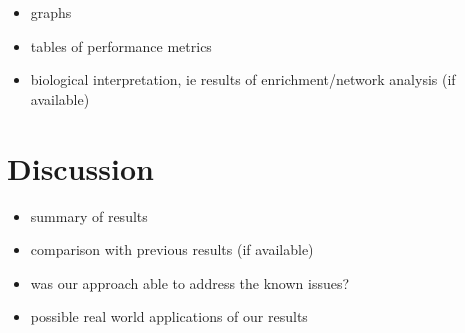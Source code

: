 \documentclass[11pt, onecolumn, twoside]{article}
\begin{document}
\begin{itemize}
\item graphs
\item tables of performance metrics
\item biological interpretation, ie results of enrichment/network analysis (if available)
\end{itemize}

\section{Discussion}\label{discussion}

\begin{itemize}
\item summary of results
\item comparison with previous results (if available)
\item was our approach able to address the known issues?
\item possible real world applications of our results
\end{itemize}

\printbibliography
\end{document}
